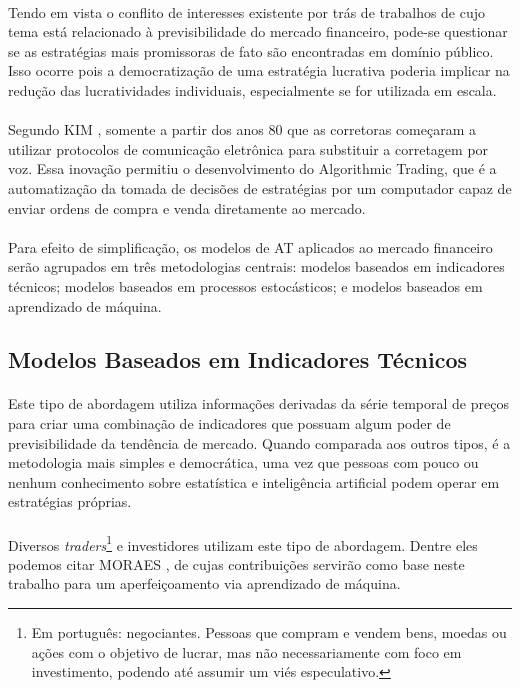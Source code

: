 \paragraph{} Tendo em vista o conflito de interesses existente por trás de trabalhos de cujo tema está relacionado à previsibilidade do mercado financeiro, pode-se questionar se as estratégias mais promissoras de fato são encontradas em domínio público. Isso ocorre pois a democratização de uma estratégia lucrativa poderia implicar na redução das lucratividades individuais, especialmente se for utilizada em escala.

\paragraph{} Segundo KIM \cite{kim2010electronic}, somente a partir dos anos 80 que as corretoras começaram a utilizar protocolos de comunicação eletrônica para substituir a corretagem por voz. Essa inovação permitiu o desenvolvimento do Algorithmic Trading, que é a automatização da tomada de decisões de estratégias por um computador capaz de enviar ordens de compra e venda diretamente ao mercado.

\paragraph{} Para efeito de simplificação, os modelos de AT aplicados ao mercado financeiro serão agrupados em três metodologias centrais: modelos baseados em indicadores técnicos; modelos baseados em processos estocásticos; e modelos baseados em aprendizado de máquina.


\subsection{Modelos Baseados em Indicadores Técnicos}

\paragraph{} Este tipo de abordagem utiliza informações derivadas da série temporal de preços para criar uma combinação de indicadores que possuam algum poder de previsibilidade da tendência de mercado. Quando comparada aos outros tipos, é a metodologia mais simples e democrática, uma vez que pessoas com pouco ou nenhum conhecimento sobre estatística e inteligência artificial podem operar em estratégias próprias.

\paragraph{} Diversos \textit{traders}\footnote{Em português: negociantes. Pessoas que compram e vendem bens, moedas ou ações com o objetivo de lucrar, mas não necessariamente com foco em investimento, podendo até assumir um viés especulativo.} e investidores utilizam este tipo de abordagem. Dentre eles podemos citar MORAES \cite{moraes2007se}, de cujas contribuições servirão como base neste trabalho para um aperfeiçoamento via aprendizado de máquina.


